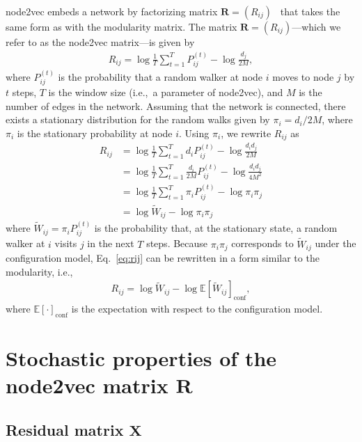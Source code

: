 \documentclass[12pt]{article} %
\def\mat#1{\mathbf{#1}}
\def\Exp{{\mathbb E}}
\def\ie{i.e.,~}
\begin{document}
node2vec embeds a network by factorizing matrix $\mat{R}=(R_{ij})$~\cite{Qiu2018} that takes the same form as with the modularity matrix.
The matrix $\mat{R}=(R_{ij})$---which we refer to as the node2vec matrix---is given by
\begin{align}
    R_{ij} = \log{ \frac{1}{T}\sum_{t=1}^T P^{(t)}_{ij}} - \log \frac{d_j}{2M}, \label{eq:rij}
\end{align}
where $P^{(t)}_{ij}$ is the probability that a random walker at node $i$ moves to node $j$ by $t$ steps, $T$ is the window size (\ie a parameter of node2vec), and
$M$ is the number of edges in the network.
Assuming that the network is connected, there exists a stationary distribution for the random walks given by $\pi_i = d_i / 2M$,
where $\pi_i$ is the stationary probability at node $i$.
Using $\pi_i$, we rewrite $R_{ij}$ as
\begin{align}
    R_{ij} & = \log{ \frac{1}{T}\sum_{t=1}^T d_i P^{(t)}_{ij}} - \log \frac{d_i d_j}{2M} \\
           & = \log{\frac{1}{T}\sum_{t=1}^T \frac{d_i}{2M} P^{(t)}_{ij}} - \log \frac{d_i d_j}{4M^2} \\
           & = \log{\frac{1}{T}\sum_{t=1}^T \pi_i P^{(t)}_{ij}} - \log \pi_i \pi_j \\
           & = \log{\tilde W_{ij}} - \log \pi_i \pi_j
\end{align}
where $\tilde W_{ij} = \pi_i P_{ij} ^{(t)}$ is the probability that, at the stationary state,
a random walker at $i$ visits $j$ in the next $T$ steps.
Because $\pi_i \pi_j$ corresponds to $\tilde W_{ij}$ under the configuration model, Eq.~\eqref{eq:rij} can be rewritten in a form similar to the modularity, \ie
\begin{align}
    \label{eq:modularity}
    R_{ij}  = \log{\tilde W_{ij}} - \log \Exp\left[ \tilde W_{ij} \right]_{\text{conf}},
\end{align}
where $\Exp\left[ \cdot \right]_{\text{conf}}$ is the expectation with respect to the configuration model.

\section{Stochastic properties of the node2vec matrix $\mat{R}$}

\subsection{Residual matrix $\mat{X}$}
\end{document}
